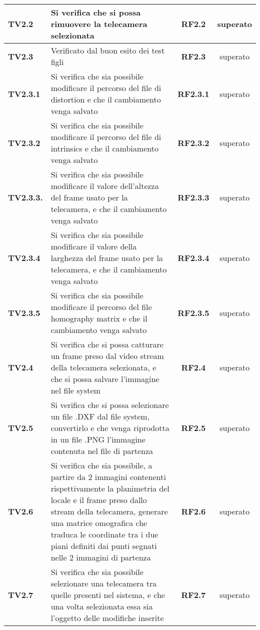 \begin{center}
\begin{longtable}{ | l | p{5cm} | c | c |}
\textbf{TV2.2} & Si verifica che si possa rimuovere la telecamera selezionata & \textbf{RF2.2} &  \textcolor{green!80!blue}{superato}  \\ \hline 
\textbf{TV2.3} & Verificato dal buon esito dei test figli & \textbf{RF2.3} &  \textcolor{green!80!blue}{superato}  \\ \hline 
\textbf{TV2.3.1} & Si verifica che sia possibile modificare il percorso del file di distortion e che il cambiamento venga salvato & \textbf{RF2.3.1} &  \textcolor{green!80!blue}{superato}  \\ \hline 
\textbf{TV2.3.2} & Si verifica che sia possibile modificare il percorso del file di intrinsics e che il cambiamento venga salvato & \textbf{RF2.3.2} &  \textcolor{green!80!blue}{superato}  \\ \hline 
\textbf{TV2.3.3.} & Si verifica che sia possibile modificare il valore dell'altezza del frame usato per la telecamera, e che il cambiamento venga salvato & \textbf{RF2.3.3} &  \textcolor{green!80!blue}{superato}  \\ \hline 
\textbf{TV2.3.4} & Si verifica che sia possibile modificare il valore della larghezza del frame usato per la telecamera, e che il cambiamento venga salvato & \textbf{RF2.3.4} &  \textcolor{green!80!blue}{superato}  \\ \hline 
\textbf{TV2.3.5} & Si verifica che sia possibile modificare il percorso del file homography matrix e che il cambiamento venga salvato & \textbf{RF2.3.5} &  \textcolor{green!80!blue}{superato}  \\ \hline 
\textbf{TV2.4} & Si verifica che si possa catturare un frame preso dal video stream della telecamera selezionata, e che si possa salvare l'immagine nel file system & \textbf{RF2.4} &  \textcolor{green!80!blue}{superato}  \\ \hline 
\textbf{TV2.5} & Si verifica che si possa selezionare un file .DXF dal file system, convertirlo e che venga riprodotta in un file .PNG l'immagine contenuta nel file di partenza & \textbf{RF2.5} &  \textcolor{green!80!blue}{superato}  \\ \hline 
\textbf{TV2.6} & Si verifica che sia possibile, a partire da 2 immagini contenenti rispettivamente la planimetria del locale e il frame preso dallo stream della telecamera, generare una matrice omografica che traduca le coordinate tra i due piani definiti dai punti segnati nelle 2 immagini di partenza & \textbf{RF2.6} &  \textcolor{green!80!blue}{superato}  \\ \hline 
\textbf{TV2.7} & Si verifica che sia possibile selezionare una telecamera tra quelle presenti nel sistema, e che una volta selezionata essa sia l'oggetto delle modifiche inserite & \textbf{RF2.7} &  \textcolor{green!80!blue}{superato}  \\ \hline 

\end{longtable}
\end{center}

